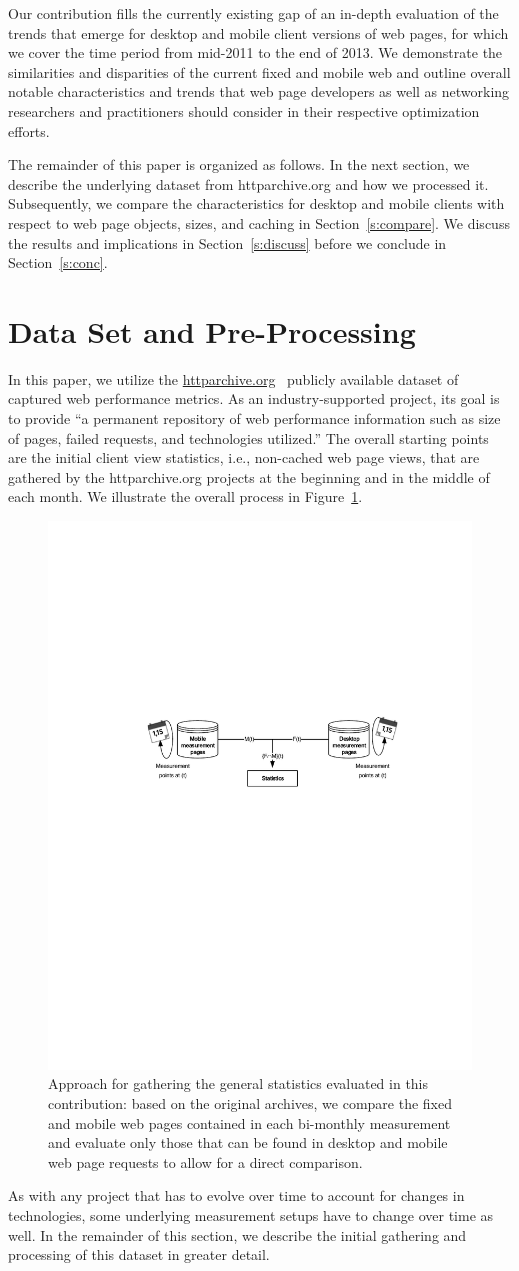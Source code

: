 \documentclass[journal,final]{IEEEtran}
\begin{document}
Our contribution fills the currently existing gap of an in-depth evaluation of the trends that emerge for desktop and mobile client versions of web pages, for which we cover the time period from mid-2011 to the end of 2013.
We demonstrate the similarities and disparities of the current fixed and mobile web and outline overall notable characteristics and trends that web page developers as well as networking researchers and practitioners should consider in their respective optimization efforts.

The remainder of this paper is organized as follows. 
In the next section, we describe the underlying dataset from httparchive.org and how we processed it.
Subsequently, we compare the characteristics for desktop and mobile clients with respect to web page objects, sizes, and caching in Section~\ref{s:compare}.
We discuss the results and implications in Section~\ref{s:discuss} before we conclude in Section~\ref{s:conc}.



\section{Data Set and Pre-Processing}
\label{s:dataset}
In this paper, we utilize the \url{httparchive.org}~\cite{ht13} publicly available dataset of captured web performance metrics. 
As an industry-supported project, its goal is to provide ``a permanent repository of web performance information such as size of pages, failed requests, and technologies utilized.''
The overall starting points are the initial client view statistics, i.e., non-cached web page views, that are gathered by the httparchive.org projects at the beginning and in the middle of each month.
We illustrate the overall process in Figure~\ref{fig:setup}.
\begin{figure}
	\centering
	\includegraphics[width=.45\textwidth]{setup}
	\caption{Approach for gathering the general statistics evaluated in this contribution: based on the original archives, we compare the fixed and mobile web pages contained in each bi-monthly measurement and evaluate only those that can be found in desktop and mobile web page requests to allow for a direct comparison.}
	\label{fig:setup}
\end{figure}
As with any project that has to evolve over time to account for changes in technologies, some underlying measurement setups have to change over time as well.
In the remainder of this section, we describe the initial gathering and processing of this dataset in greater detail.
\end{document}
